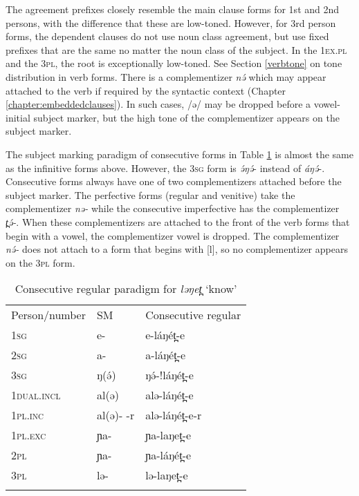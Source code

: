 The agreement prefixes closely resemble the main clause forms for 1st and 2nd persons, with the difference that these are low-toned. However, for 3rd person forms, the dependent clauses do not use noun class agreement, but use fixed prefixes that are the same no matter the noun class of the subject. In the 1\textsc{ex}.\textsc{pl} and the 3\textsc{pl}, the root is exceptionally low-toned. See Section \ref{verbtone} on tone distribution in verb forms. There is a complementizer \textit{nə́ } which may appear attached to the verb if required by the syntactic context (Chapter \ref{chapter:embeddedclauses}). In such cases, /ə/ may be dropped before a vowel-initial subject marker, but the high tone of the complementizer appears on the subject marker.

The subject marking paradigm of consecutive forms in Table \ref{tab:ch11:agr4} is almost the same as the infinitive forms above. However, the 3\textsc{sg} form is \textit{ə́ŋə́}- instead of \textit{áŋə́}-. Consecutive forms always have one of two complementizers attached before the subject marker. The perfective forms (regular and venitive) take the complementizer \textit{nə-} while the consecutive imperfective has the complementizer \textit{t̪ə́-}. When these complementizers are attached to the front of the verb forms that begin with a vowel, the complementizer vowel is dropped. The complementizer \textit{nə́-} does not attach to a form that begins with [l], so no complementizer appears on the 3\textsc{pl} form. %

\begin{table}
	\begin{tabular}[t]{lll}
	\lsptoprule
Person/number 	& 	SM  & 	Consecutive regular	\\ 
1\textsc{sg}				&	e- 	&	e-láŋét̪-e  \\
2\textsc{sg} 			&	a- 	&	a-láŋét̪-e\\
3\textsc{sg}				&  ŋ(ə́) 	&	ŋə́-!láŋét̪-e\\
1\textsc{dual.incl}		&	al(ə)  	&	alə-láŋét̪-e\\
1\textsc{pl.inc}			&	al(ə)- -r& 	alə-láŋét̪-e-r\\
1\textsc{pl.exc}			&	ɲa-  	&	ɲa-laŋet̪-e\\
2\textsc{pl}				&	ɲa-  	&	ɲa-láŋét̪-e\\
3\textsc{pl} 			&	lə- 	&	lə-laŋet̪-e\\
	\lspbottomrule
	\end{tabular}
	\caption{Consecutive regular paradigm for \textit{ləŋet̪} `know'}
	\label{tab:ch11:agr4} 
\end{table} %

